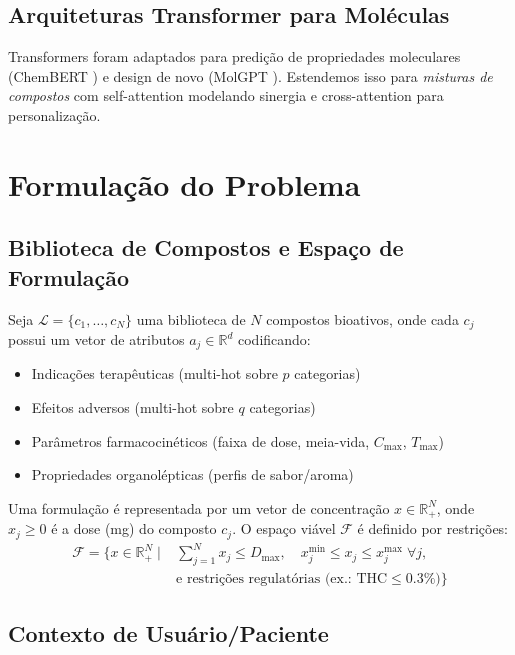 \documentclass[11pt,a4paper]{article}
\begin{document}
\subsection{Arquiteturas Transformer para Moléculas}

Transformers foram adaptados para predição de propriedades moleculares (ChemBERT \cite{Chithrananda2020}) e design de novo (MolGPT \cite{Bagal2022}). Estendemos isso para \textit{misturas de compostos} com self-attention modelando sinergia e cross-attention para personalização.

\section{Formulação do Problema}

\subsection{Biblioteca de Compostos e Espaço de Formulação}

Seja \(\mathcal{L} = \{c_1, \dots, c_N\}\) uma biblioteca de \(N\) compostos bioativos, onde cada \(c_j\) possui um vetor de atributos \(a_j \in \mathbb{R}^d\) codificando:
\begin{itemize}
    \item Indicações terapêuticas (multi-hot sobre \(p\) categorias)
    \item Efeitos adversos (multi-hot sobre \(q\) categorias)
    \item Parâmetros farmacocinéticos (faixa de dose, meia-vida, \(C_{\max}\), \(T_{\max}\))
    \item Propriedades organolépticas (perfis de sabor/aroma)
\end{itemize}

Uma formulação é representada por um vetor de concentração \(x \in \mathbb{R}_+^N\), onde \(x_j \geq 0\) é a dose (mg) do composto \(c_j\). O espaço viável \(\mathcal{F}\) é definido por restrições:
\begin{align}
\mathcal{F} = \Big\{ x \in \mathbb{R}_+^N \mid& \sum_{j=1}^N x_j \leq D_{\max}, \quad x_j^{\min} \leq x_j \leq x_j^{\max} \;\forall j, \nonumber \\
& \text{e restrições regulatórias (ex.: THC} \leq 0.3\%) \Big\}
\end{align}

\subsection{Contexto de Usuário/Paciente}
\end{document}

